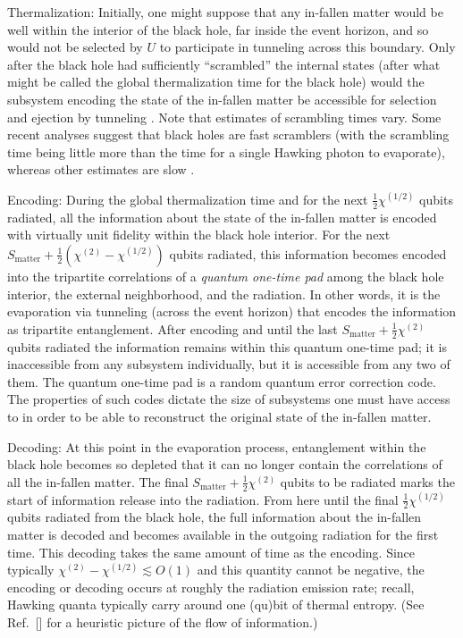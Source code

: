 \documentclass[twocolumn,aps,showpacs,prl]{revtex4}
\begin{document}
Thermalization: Initially, one might suppose that any 
in-fallen matter would be well
within the interior of the black hole, far inside the event horizon,
and so would not be selected by $U$ to participate in tunneling across
this boundary. Only after the black hole had sufficiently ``scrambled''
the internal states (after what might be called the global thermalization
time \cite{Hayden07} for the black hole) would the subsystem encoding
the state of the in-fallen matter be accessible for selection and
ejection by tunneling \cite{fnB}. Note that estimates of scrambling
times vary. Some recent analyses suggest that black holes are fast 
scramblers \cite{Hayden07,Sekino08} (with the scrambling time being little 
more than the time for a single Hawking photon to evaporate), whereas 
other estimates are slow \cite{Giddings07}. 

Encoding: During the global thermalization time and for the next
$\frac{1}{2}\chi^{(1/2)}$ qubits radiated, all the information
about the state of the in-fallen matter is encoded with virtually
unit fidelity within the black hole interior. For the next
$S_{\text{matter}}+\frac{1}{2}(\chi^{(2)}-\chi^{(1/2)})$ qubits
radiated, this information becomes encoded into the tripartite
correlations of a {\it quantum one-time pad} \cite{me} among the black
hole interior, the external neighborhood, and the radiation. In other
words, it is the evaporation via tunneling (across the event horizon)
that encodes the information as tripartite entanglement. After encoding
and until the last $S_{\text{matter}}+\frac{1}{2} \chi^{(2)}$
qubits radiated the information remains within this quantum one-time pad;
it is inaccessible from any subsystem individually, but it is
accessible from any two of them. The quantum one-time pad is a random
quantum error correction code. The properties of such codes dictate the
size of subsystems one must have access to in order to be able to
reconstruct the original state of the in-fallen matter.

Decoding:
At this point in the evaporation process, entanglement within the 
black hole becomes so depleted that it can no longer contain the 
correlations of all the in-fallen matter. The final
$S_{\text{matter}}+\frac{1}{2} \chi^{(2)}$ qubits to be radiated marks
the start of information release into the radiation. From here until
the final $\frac{1}{2}\chi^{(1/2)}$ qubits radiated from the black hole, 
the full information about the in-fallen matter is decoded and becomes
available in the outgoing radiation for the first time. This decoding
takes the same amount of time as the encoding. Since typically
$\chi^{(2)}-\chi^{(1/2)} \lesssim O(1)$ and this 
quantity cannot be negative, the encoding or decoding occurs at roughly the 
radiation emission rate; recall, Hawking quanta typically carry around
one (qu)bit of thermal entropy. (See Ref.~[] for a
heuristic picture of the flow of information.) 
\end{document}
